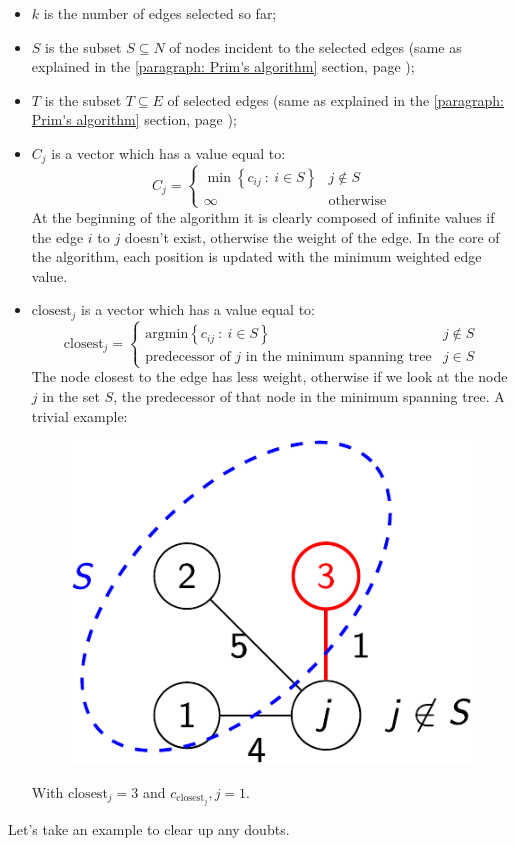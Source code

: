 \begin{itemize}
    \item $k$ is the number of edges selected so far;

    \item $S$ is the subset $S \subseteq N$ of nodes incident to the selected edges (same as explained in the \ref{paragraph: Prim's algorithm} section, page \pageref{paragraph: Prim's algorithm});
    
    \item $T$ is the subset $T \subseteq E$ of selected edges (same as explained in the \ref{paragraph: Prim's algorithm} section, page \pageref{paragraph: Prim's algorithm});
    
    \item $C_{j}$ is a vector which has a value equal to:
    \begin{equation*}
        C_{j} = \begin{cases}
            \min\left\{c_{ij} \: : \: i \in S\right\} & j \notin S \\
            \infty & \text{otherwise}
        \end{cases}
    \end{equation*}
    At the beginning of the algorithm it is clearly composed of infinite values if the edge $i$ to $j$ doesn't exist, otherwise the weight of the edge. In the core of the algorithm, each position is updated with the minimum weighted edge value.
    
    \item $\text{closest}_{j}$ is a vector which has a value equal to:
    \begin{equation*}
        \text{closest}_{j} = \begin{cases}
            \mathrm{argmin}\left\{c_{ij} \: : \: i \in S\right\} & j \notin S \\
            \text{predecessor of }j\text{ in the minimum spanning tree} & j \in S
        \end{cases}
    \end{equation*}
    The node closest to the edge has less weight, otherwise if we look at the node $j$ in the set $S$, the predecessor of that node in the minimum spanning tree. A trivial example:
    \begin{figure}[!htp]
        \centering
        \includegraphics[width=.3\textwidth]{img/prims-alg-7.pdf}
    \end{figure}
    
    With $\mathrm{closest}_{j} = 3$ and $c_{\mathrm{closest}_{j}},j = 1$.
\end{itemize}
Let's take an example to clear up any doubts.

